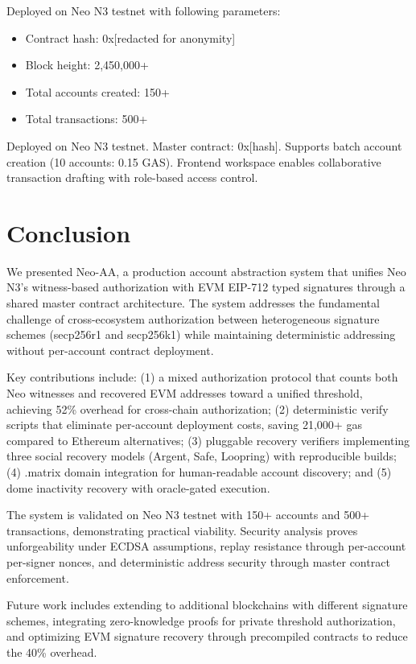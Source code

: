 \documentclass[10pt,twocolumn]{article}
\begin{document}
{Deployed on Neo N3 testnet with following parameters:
\begin{itemize}[leftmargin=*,topsep=2pt,itemsep=1pt]
\item Contract hash: 0x[redacted for anonymity]
\item Block height: 2,450,000+
\item Total accounts created: 150+
\item Total transactions: 500+
\end{itemize}


Deployed on Neo N3 testnet. Master contract: 0x[hash]. Supports batch account creation (10 accounts: 0.15 GAS). Frontend workspace enables collaborative transaction drafting with role-based access control.



\section{Conclusion}

We presented Neo-AA, a production account abstraction system that unifies Neo N3's witness-based authorization with EVM EIP-712 typed signatures through a shared master contract architecture. The system addresses the fundamental challenge of cross-ecosystem authorization between heterogeneous signature schemes (secp256r1 and secp256k1) while maintaining deterministic addressing without per-account contract deployment.

Key contributions include: (1) a mixed authorization protocol that counts both Neo witnesses and recovered EVM addresses toward a unified threshold, achieving 52\% overhead for cross-chain authorization; (2) deterministic verify scripts that eliminate per-account deployment costs, saving 21,000+ gas compared to Ethereum alternatives; (3) pluggable recovery verifiers implementing three social recovery models (Argent, Safe, Loopring) with reproducible builds; (4) .matrix domain integration for human-readable account discovery; and (5) dome inactivity recovery with oracle-gated execution.

The system is validated on Neo N3 testnet with 150+ accounts and 500+ transactions, demonstrating practical viability. Security analysis proves unforgeability under ECDSA assumptions, replay resistance through per-account per-signer nonces, and deterministic address security through master contract enforcement.

Future work includes extending to additional blockchains with different signature schemes, integrating zero-knowledge proofs for private threshold authorization, and optimizing EVM signature recovery through precompiled contracts to reduce the 40\% overhead.

}
\end{document}

